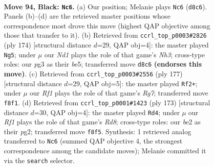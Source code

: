 \documentclass[11pt]{article}
\begin{document}
\clearpage

\begin{figure}[p]\centering
\begin{subfigure}{0.46\textwidth}\centering
\resizebox{\linewidth}{!}{%
\newchessgame
\chessboard[
  setfen={3n1r2/3k4/PR6/8/8/4K1PP/2P1B3/8 b - - 22 94},
  showmover=false,
  pgfstyle=straightmove, color=movearrow, markmove={d8-c6}
]}
\caption{}
\end{subfigure}\hfill
\begin{subfigure}{0.46\textwidth}\centering
\resizebox{\linewidth}{!}{%
\newchessgame
\chessboard[
  setfen={4k3/1R6/3p2P1/4b3/6K1/7N/8/5r2 w - - 13 88},
  showmover=false,
  pgfstyle=straightmove, color=movearrow, markmove={h3-g5}
]}
\caption{}
\end{subfigure}
\\[4pt]
\begin{subfigure}{0.46\textwidth}\centering
\resizebox{\linewidth}{!}{%
\newchessgame
\chessboard[
  setfen={8/8/8/2n2B2/3k1K2/7P/6r1/4R3 b - - 8 89},
  showmover=false,
  pgfstyle=straightmove, color=movearrow, markmove={g2-f2}
]}
\caption{}
\end{subfigure}\hfill
\begin{subfigure}{0.46\textwidth}\centering
\resizebox{\linewidth}{!}{%
\newchessgame
\chessboard[
  setfen={8/8/R7/4nk2/8/7P/6PK/3r4 b - - 12 87},
  showmover=false,
  pgfstyle=straightmove, color=movearrow, markmove={d1-d4}
]}
\caption{}
\end{subfigure}
\caption{\textbf{Move 94, Black: \texttt{Nc6}.} (a) Our position; Melanie plays \texttt{Nc6} (\texttt{d8c6}). Panels (b)--(d) are the retrieved master positions whose correspondence most drove this move (highest QAP objective among those that transfer to it). (b) Retrieved from \texttt{ccrl\_top\_p0003\#2826} (ply 174) [structural distance $d$=29, QAP obj=4]: the master played \texttt{Ng5}; under $\mu$ our \emph{Nd1} plays the role of that game's \emph{Nh3}; cross-type roles: our \emph{p}g3 as their \emph{b}e5; transferred move \texttt{d8c6} \textbf{(endorses this move)}. (c) Retrieved from \texttt{ccrl\_top\_p0003\#2556} (ply 177) [structural distance $d$=29, QAP obj=5]: the master played \texttt{Rf2+}; under $\mu$ our \emph{Rf1} plays the role of that game's \emph{Rg7}; transferred move \texttt{f8f1}. (d) Retrieved from \texttt{ccrl\_top\_p0001\#1423} (ply 173) [structural distance $d$=30, QAP obj=4]: the master played \texttt{Rd4}; under $\mu$ our \emph{Rf1} plays the role of that game's \emph{Rd8}; cross-type roles: our \emph{b}e2 as their \emph{p}g2; transferred move \texttt{f8f5}. Synthesis: 1 retrieved analog transferred to \texttt{Nc6} (summed QAP objective 4, the strongest correspondence among the candidate moves); Melanie committed it via the \texttt{search} selector.}
\label{fig:thought-m187}
\end{figure}
\end{document}
